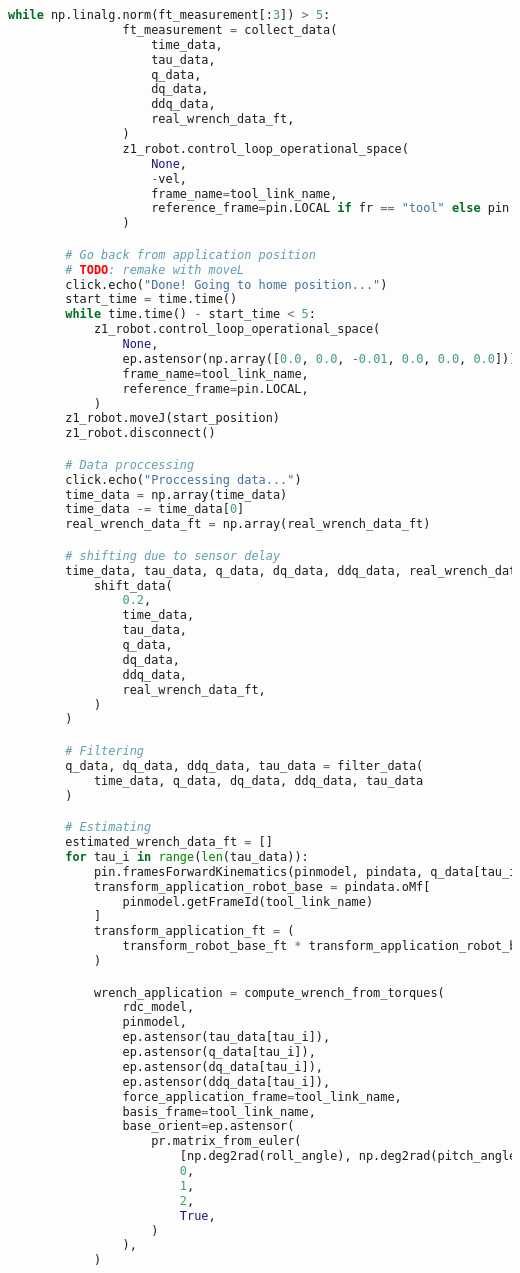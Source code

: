 \begin{lstlisting}[language=python, caption=\raggedright{verification/fs\_verification.py}, frame=single]
            while np.linalg.norm(ft_measurement[:3]) > 5:
                ft_measurement = collect_data(
                    time_data,
                    tau_data,
                    q_data,
                    dq_data,
                    ddq_data,
                    real_wrench_data_ft,
                )
                z1_robot.control_loop_operational_space(
                    None,
                    -vel,
                    frame_name=tool_link_name,
                    reference_frame=pin.LOCAL if fr == "tool" else pin.WORLD,
                )

        # Go back from application position
        # TODO: remake with moveL
        click.echo("Done! Going to home position...")
        start_time = time.time()
        while time.time() - start_time < 5:
            z1_robot.control_loop_operational_space(
                None,
                ep.astensor(np.array([0.0, 0.0, -0.01, 0.0, 0.0, 0.0])),
                frame_name=tool_link_name,
                reference_frame=pin.LOCAL,
            )
        z1_robot.moveJ(start_position)
        z1_robot.disconnect()

        # Data proccessing
        click.echo("Proccessing data...")
        time_data = np.array(time_data)
        time_data -= time_data[0]
        real_wrench_data_ft = np.array(real_wrench_data_ft)

        # shifting due to sensor delay
        time_data, tau_data, q_data, dq_data, ddq_data, real_wrench_data_ft = (
            shift_data(
                0.2,
                time_data,
                tau_data,
                q_data,
                dq_data,
                ddq_data,
                real_wrench_data_ft,
            )
        )

        # Filtering
        q_data, dq_data, ddq_data, tau_data = filter_data(
            time_data, q_data, dq_data, ddq_data, tau_data
        )

        # Estimating
        estimated_wrench_data_ft = []
        for tau_i in range(len(tau_data)):
            pin.framesForwardKinematics(pinmodel, pindata, q_data[tau_i])
            transform_application_robot_base = pindata.oMf[
                pinmodel.getFrameId(tool_link_name)
            ]
            transform_application_ft = (
                transform_robot_base_ft * transform_application_robot_base
            )

            wrench_application = compute_wrench_from_torques(
                rdc_model,
                pinmodel,
                ep.astensor(tau_data[tau_i]),
                ep.astensor(q_data[tau_i]),
                ep.astensor(dq_data[tau_i]),
                ep.astensor(ddq_data[tau_i]),
                force_application_frame=tool_link_name,
                basis_frame=tool_link_name,
                base_orient=ep.astensor(
                    pr.matrix_from_euler(
                        [np.deg2rad(roll_angle), np.deg2rad(pitch_angle), 0.0],
                        0,
                        1,
                        2,
                        True,
                    )
                ),
            )


\end{lstlisting}
